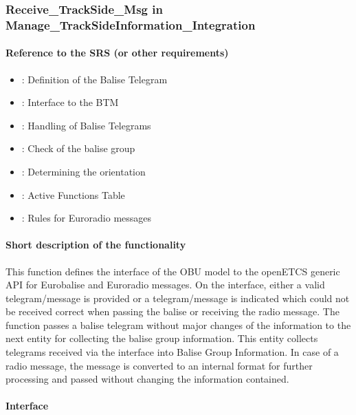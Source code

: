 \subsubsection{Receive\_TrackSide\_Msg in Manage\_TrackSideInformation\_Integration}

\paragraph{Reference to the SRS (or other requirements)}
\begin{itemize}
  \item \cite[Chapt.~7 and 8]{subset-026}: Definition of the Balise Telegram
  \item \cite[Chapt.~4.2.2, 4.2.4, 4.2.9]{subset-036}: Interface to the BTM
  \item \cite[Chapt.~3.4.1 - 3.4.3, 3.16.2]{subset-026}: Handling of Balise Telegrams
  \item \cite[Chapt.~3.16.2]{subset-026}: Check of the balise group
  \item \cite[Chapt.~3.4.2]{subset-026}: Determining the orientation
  \item \cite[Chapt.~4.5.2]{subset-026}: Active Functions Table
  \item \cite[Chapt.~8.4.4]{subset-026}: Rules for Euroradio messages
\end{itemize}

\paragraph{Short description of the functionality}
This function defines the interface of the OBU model to the openETCS generic API for Eurobalise  and Euroradio messages. On the interface, either a valid telegram/message is provided or a telegram/message is indicated which could not be received correct when passing the balise or receiving the radio message. The function passes a balise telegram without major changes of the information to the next entity for collecting the balise group information. This entity collects telegrams received via the interface into Balise Group Information. In case of a radio message, the message is converted to an internal format for further processing and passed without changing the information contained.

\paragraph{Interface}

